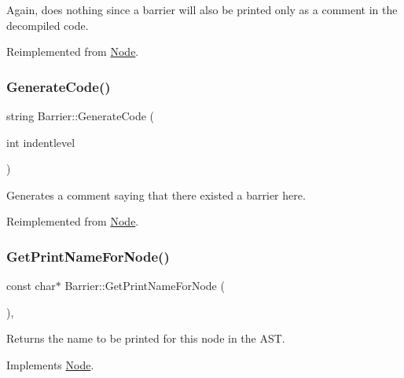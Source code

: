 Again, does nothing since a barrier will also be printed only as a comment in the decompiled code. 

Reimplemented from \hyperlink{class_node_a5f88d55c6f253a29def7ccc443d83d47}{Node}.

\mbox{\label{class_barrier_a8b5b9b199e68d00ae5d11336a1b4591f}} 
\subsubsection{\texorpdfstring{Generate\+Code()}{GenerateCode()}}
{\footnotesize\ttfamily string Barrier\+::\+Generate\+Code (\begin{DoxyParamCaption}\item[{int}]{indentlevel }\end{DoxyParamCaption})\hspace{0.3cm}{\ttfamily [virtual]}}

Generates a comment saying that there existed a barrier here. 

Reimplemented from \hyperlink{class_node_acb60e526730e8436056375a3055c2c32}{Node}.

\mbox{\label{class_barrier_a3b32a126f5fb975defc7f8c3614a0c68}} 
\subsubsection{\texorpdfstring{Get\+Print\+Name\+For\+Node()}{GetPrintNameForNode()}}
{\footnotesize\ttfamily const char$\ast$ Barrier\+::\+Get\+Print\+Name\+For\+Node (\begin{DoxyParamCaption}{ }\end{DoxyParamCaption})\hspace{0.3cm}{\ttfamily [inline]}, {\ttfamily [virtual]}}

Returns the name to be printed for this node in the A\+ST. 

Implements \hyperlink{class_node_a56e29657306ffb004d69c6929ae44269}{Node}.

\mbox{\label{class_barrier_a4210ab976223e77243f019045f0f3875}} 
